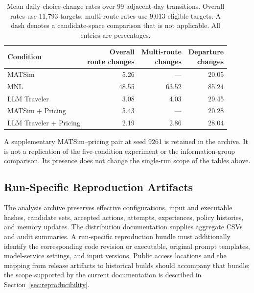 \begin{table}[htbp]
\centering\small
\caption{Mean daily choice-change rates over 99 adjacent-day transitions. Overall rates use 11,793 targets; multi-route rates use 9,013 eligible targets. A dash denotes a candidate-space comparison that is not applicable. All entries are percentages.}
\label{tab:supp-switching}
\begin{tabularx}{\linewidth}{@{}Xrrr@{}}
\toprule
Condition & \shortstack{Overall\\route changes} & \shortstack{Multi-route\\changes} & \shortstack{Departure\\changes} \\
\midrule
MATSim & 5.26 & --- & 20.05 \\
MNL & 48.55 & 63.52 & 85.24 \\
LLM Traveler & 3.08 & 4.03 & 29.45 \\
MATSim + Pricing & 5.43 & --- & 20.28 \\
LLM Traveler + Pricing & 2.19 & 2.86 & 28.04 \\
\bottomrule
\end{tabularx}
\end{table}

A supplementary MATSim--pricing pair at seed 9261 is retained in the archive. It is not a replication of the five-condition experiment or the information-group comparison. Its presence does not change the single-run scope of the tables above.

\subsection{Run-Specific Reproduction Artifacts}
\label{app:archive-scope}

The analysis archive preserves effective configurations, input and executable hashes, candidate sets, accepted actions, attempts, experiences, policy histories, and memory updates. The distribution documentation supplies aggregate CSVs and audit summaries. A run-specific reproduction bundle must additionally identify the corresponding code revision or executable, original prompt templates, model-service settings, and input versions. Public access locations and the mapping from release artifacts to historical builds should accompany that bundle; the scope supported by the current documentation is described in Section~\ref{sec:reproducibility}.
\FloatBarrier
